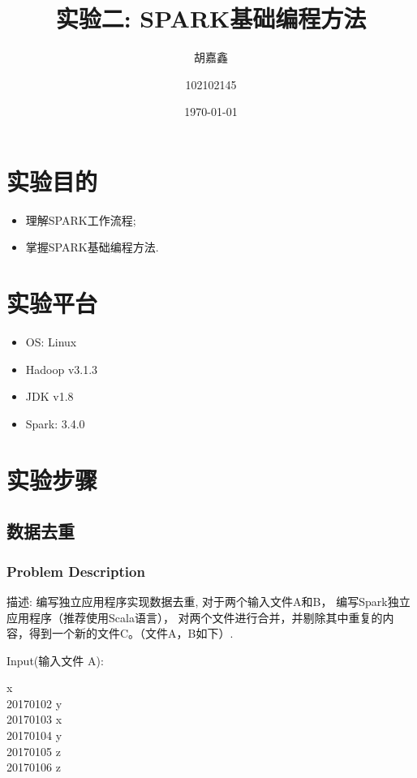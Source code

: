 \documentclass{article}
\title{实验二: SPARK基础编程方法}
\author{胡嘉鑫 \and 102102145}
\date{\today}
\begin{document}
    \maketitle
    \tableofcontents

    \section{实验目的}
    \begin{itemize}
      \item	理解SPARK工作流程;
      \item	掌握SPARK基础编程方法.
    \end{itemize}

    \section{实验平台}
    \begin{itemize}
      \item OS: Linux
      \item Hadoop v3.1.3
      \item JDK v1.8
      \item Spark: 3.4.0
    \end{itemize}

    \section{实验步骤}

    \subsection{数据去重}

    \subsubsection{Problem Description}

    描述: 编写独立应用程序实现数据去重, 对于两个输入文件A和B， 编写Spark独立应用程序（推荐使用Scala语言），
    对两个文件进行合并，并剔除其中重复的内容，得到一个新的文件C。（文件A，B如下）.

    Input(输入文件 A):

     x \\
    20170102 y \\
    20170103 x \\
    20170104 y \\
    20170105 z \\
    20170106 z
\end{document}
